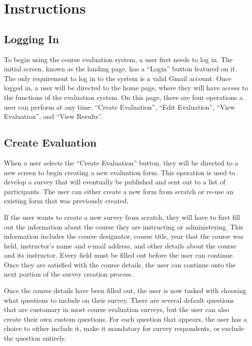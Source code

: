 \documentclass{article}
\begin{document}
\section{Instructions}

\subsection{Logging In}

To begin using the course evaluation system, a user first needs to log in. The initial screen, known as the landing page, has a ``Login'' button featured on it. The only requirement to log in to the system is a valid Gmail account. Once logged in, a user will be directed to the home page, where they will have access to the functions of the evaluation system. On this page, there are four operations a user can perform at any time: ``Create Evaluation'', ``Edit Evaluation'', ``View Evaluation'', and ``View Results''.

\subsection{Create Evaluation}

When a user selects the ``Create Evaluation'' button, they will be directed to a new screen to begin creating a new evaluation form. This operation is used to develop a survey that will eventually be published and sent out to a list of participants. The user can either create a new form from scratch or re-use an existing form that was previously created.

If the user wants to create a new survey from scratch, they will have to first fill out the information about the course they are instructing or administering. This information includes the course designator, course title, year that the course was held, instructor's name and e-mail address, and other details about the course and its instructor. Every field must be filled out before the user can continue. Once they are satisfied with the course details, the user can continue onto the next portion of the survey creation process.

Once the course details have been filled out, the user is now tasked with choosing what questions to include on their survey. There are several default questions that are customary in most course evaluation surveys, but the user can also create their own custom questions. For each question that appears, the user has a choice to either include it, make it mandatory for survey respondents, or exclude the question entirely.
\end{document}
